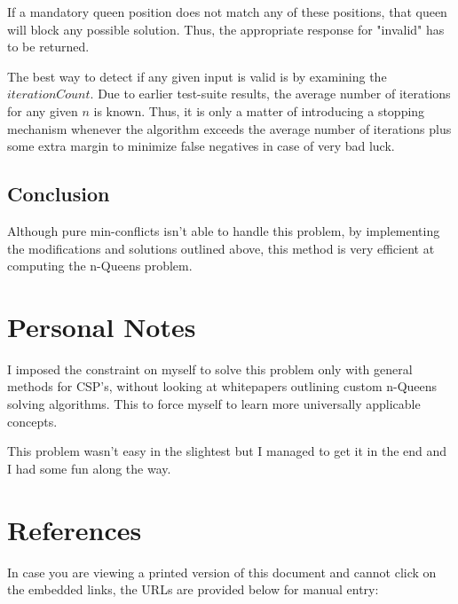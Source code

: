 \documentclass{article}
\begin{document}
If a mandatory queen position does not match any of these positions, that queen will block any possible solution.
Thus, the appropriate response for "invalid" has to be returned.

The best way to detect if any given input is valid is by examining the \(iterationCount\).
Due to earlier test-suite results, the average number of iterations for any given \(n\) is known.
Thus, it is only a matter of introducing a stopping mechanism whenever the algorithm exceeds the average number of iterations
plus some extra margin to minimize false negatives in case of very bad luck.

\subsection{Conclusion}
Although pure min-conflicts isn't able to handle this problem, by implementing the modifications and solutions outlined above,
this method is very efficient at computing the n-Queens problem.

\clearpage
\section{Personal Notes}
I imposed the constraint on myself to solve this problem only with general methods for CSP's,
without looking at whitepapers outlining custom n-Queens solving algorithms. This to force
myself to learn more universally applicable concepts.

This problem wasn't easy in the slightest but I managed to get it in the end and I had some fun along the way.

\section*{References}
In case you are viewing a printed version of this document and cannot click on the embedded links, the URLs are provided below for manual entry:

\sloppy
\end{document}
